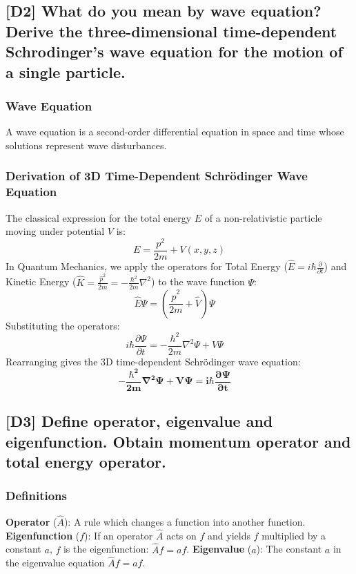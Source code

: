 \documentclass[12pt]{article}
\begin{document}
\subsection{[D2] What do you mean by wave equation? Derive the three-dimensional time-dependent Schrodinger’s wave equation for the motion of a single particle.}

\subsubsection*{Wave Equation}
A wave equation is a second-order differential equation in space and time whose solutions represent wave disturbances.

\subsubsection*{Derivation of 3D Time-Dependent Schrödinger Wave Equation}
The classical expression for the total energy $E$ of a non-relativistic particle moving under potential $V$ is:
$$
E = \frac{p^2}{2m} + V(x, y, z)
$$
In Quantum Mechanics, we apply the operators for Total Energy ($\hat{E} = i\hbar \frac{\partial}{\partial t}$) and Kinetic Energy ($\hat{K} = \frac{\hat{p}^2}{2m} = -\frac{\hbar^2}{2m}\nabla^2$) to the wave function $\Psi$:
$$
\hat{E}\Psi = \left( \frac{\hat{p}^2}{2m} + \hat{V} \right) \Psi \quad \text{}
$$
Substituting the operators:
$$
i\hbar \frac{\partial\Psi}{\partial t} = -\frac{\hbar^2}{2m}\nabla^2\Psi + V\Psi \quad \text{}
$$
Rearranging gives the 3D time-dependent Schrödinger wave equation:
$$
\mathbf{-\frac{\hbar^2}{2m} \nabla^2\Psi + V\Psi = i\hbar \frac{\partial\Psi}{\partial t}} \quad \text{}
$$

\subsection{[D3] Define operator, eigenvalue and eigenfunction. Obtain momentum operator and total energy operator.}

\subsubsection*{Definitions}
\textbf{Operator} ($\hat{A}$): A rule which changes a function into another function.
\textbf{Eigenfunction} ($f$): If an operator $\hat{A}$ acts on $f$ and yields $f$ multiplied by a constant $a$, $f$ is the eigenfunction: $\hat{A}f = af$.
\textbf{Eigenvalue} ($a$): The constant $a$ in the eigenvalue equation $\hat{A}f = af$.
\end{document}
